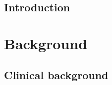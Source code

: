 \documentclass[a4paper,12pt,twoside]{report}
\author{\me}
\begin{document}


\normalsize

\clearemptydoublepage

\linenumbers

%



\tableofcontents

\clearemptydoublepage

\listoffigures

\clearemptydoublepage

\listoftables

\clearemptydoublepage
\printnomenclature
\clearemptydoublepage



\setcounter{page}{0}
%


\clearemptydoublepage


\chapter{Introduction}\label{chapter:introduction}

\clearemptydoublepage
\part{Background}\label{part:background}
\chapter{ Clinical background}\label{chapter:clinicalbachground}

\end{document}
